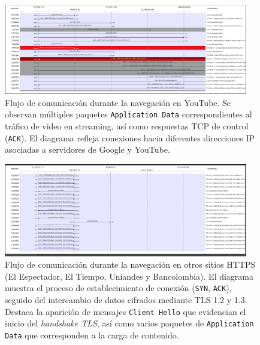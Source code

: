 \documentclass[10pt]{article}
\begin{document}
\begin{figure}[H]
    \centering
    \includegraphics[width=0.95\textwidth]{lab-02-screenshots/8.5-YouTube-flow.png}
    \caption{Flujo de comunicación durante la navegación en YouTube. 
    Se observan múltiples paquetes \texttt{Application Data} correspondientes al tráfico de video en streaming, así como respuestas TCP de control (\texttt{ACK}). 
    El diagrama refleja conexiones hacia diferentes direcciones IP asociadas a servidores de Google y YouTube.}
\end{figure}

\begin{figure}[H]
    \centering
    \includegraphics[width=0.95\textwidth]{lab-02-screenshots/8.5-HTTPS-flow.png}
    \caption{Flujo de comunicación durante la navegación en otros sitios HTTPS (El Espectador, El Tiempo, Uniandes y Bancolombia). 
    El diagrama muestra el proceso de establecimiento de conexión (\texttt{SYN}, \texttt{ACK}), seguido del intercambio de datos cifrados mediante TLS 1.2 y 1.3. 
    Destaca la aparición de mensajes \texttt{Client Hello} que evidencian el inicio del \textit{handshake TLS}, así como varios paquetes de \texttt{Application Data} que corresponden a la carga de contenido.}
\end{figure}



\renewcommand{\thesection}{8.\arabic{section}}
\end{document}
